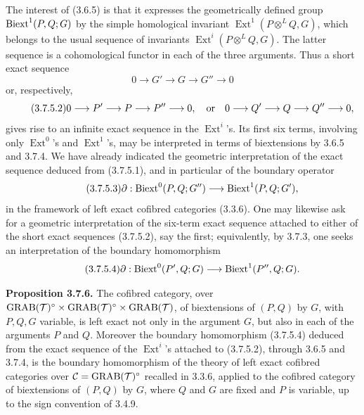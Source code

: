 \documentclass[11pt]{article}
\providecommand{\Ext}{\operatorname{Ext}}
\begin{document}
The interest of (3.6.5) is that it expresses the geometrically defined group \(\operatorname{Biext}^1(P,Q;G)\) by the simple homological invariant \(\Ext^1(P\otimes^L Q,G)\), which belongs to the usual sequence of invariants \(\Ext^i(P\otimes^L Q,G)\).  The latter sequence is a cohomological functor in each of the three arguments.  Thus a short exact sequence
\begin{equation}\tag{3.7.5.1}
        0\longrightarrow G'\longrightarrow G\longrightarrow G''\longrightarrow 0
\end{equation}
or, respectively,
\begin{equation}\tag{3.7.5.2}
        0\longrightarrow P'\longrightarrow P\longrightarrow P''\longrightarrow 0,
        \quad\hbox{or}\quad
        0\longrightarrow Q'\longrightarrow Q\longrightarrow Q''\longrightarrow 0,
\end{equation}
gives rise to an infinite exact sequence in the \(\Ext^i\)'s.  Its first six terms, involving only \(\Ext^0\)'s and \(\Ext^1\)'s, may be interpreted in terms of biextensions by 3.6.5 and 3.7.4.  We have already indicated the geometric interpretation of the exact sequence deduced from (3.7.5.1), and in particular of the boundary operator
\begin{equation}\tag{3.7.5.3}
 \partial:\operatorname{Biext}^0(P,Q;G'')\longrightarrow \operatorname{Biext}^1(P,Q;G'),
\end{equation}
in the framework of left exact cofibred categories (3.3.6).  One may likewise ask for a geometric interpretation of the six-term exact sequence attached to either of the short exact sequences (3.7.5.2), say the first; equivalently, by 3.7.3, one seeks an interpretation of the boundary homomorphism
\begin{equation}\tag{3.7.5.4}
 \partial:\operatorname{Biext}^0(P',Q;G)\longrightarrow \operatorname{Biext}^1(P'',Q;G).
\end{equation}

\textbf{Proposition 3.7.6.}  The cofibred category, over
\(\operatorname{GRAB}(\mathcal T)^{\circ}\times\operatorname{GRAB}(\mathcal T)^{\circ}\times\operatorname{GRAB}(\mathcal T)\), of biextensions of \((P,Q)\) by \(G\), with \(P,Q,G\) variable, is left exact not only in the argument \(G\), but also in each of the arguments \(P\) and \(Q\).  Moreover the boundary homomorphism (3.7.5.4) deduced from the exact sequence of the \(\Ext^i\)'s attached to (3.7.5.2), through 3.6.5 and 3.7.4, is the boundary homomorphism of the theory of left exact cofibred categories over
\(\mathcal C=\operatorname{GRAB}(\mathcal T)^{\circ}\) recalled in 3.3.6, applied to the cofibred category of biextensions of \((P,Q)\) by \(G\), where \(Q\) and \(G\) are fixed and \(P\) is variable, up to the sign convention of 3.4.9.
\end{document}
